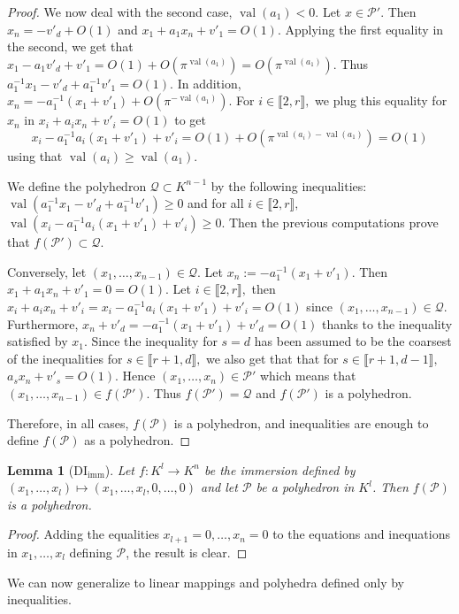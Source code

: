 \documentclass{elsarticle}
\theoremstyle{plain}
\newtheorem{lemma}[theorem]{Lemma}
\theoremstyle{definition}
\newcommand{\PP}{\mathcal{P}}
\newcommand{\Qc}{\mathcal{Q}}
\DeclareMathOperator{\val}{val}
\begin{document}
\begin{proof}
We now deal with the second case, $\val(a_1)<0.$
Let $x \in \PP'$.
Then $x_n=-v'_d+O(1)$
and $x_1+a_1 x_n+v'_1=O(1).$
Applying the first equality in the second, we get that
$x_1-a_1 v'_d +v'_1=O(1)+O(\pi^{\val(a_1)})=O(\pi^{\val(a_1)}).$
Thus $a_1^{-1}x_1- v'_d +a_1^{-1}v'_1=O(1)$.
In addition, $x_n=-a_1^{-1}(x_1+v'_1)+O(\pi^{-\val(a_1)}).$
For $i \in \llbracket 2,r \rrbracket,$ we plug this equality for $x_n$ in 
$x_i+a_i x_n+v'_i=O(1)$ to get
$$
x_i-a_1^{-1}a_i(x_1+v'_1)+v'_i=O(1)+O(\pi^{\val(a_i)-\val(a_1)})=O(1)
$$
using that $\val(a_i) \geq \val (a_1).$

We define the polyhedron $\Qc \subset K^{n-1}$ by the following inequalities:
$\val(a_1^{-1}x_1- v'_d +a_1^{-1}v'_1) \geq 0$ and for all $i \in \llbracket 2,r \rrbracket,$
$\val(x_i-a_1^{-1}a_i(x_1+v'_1)+v'_i) \geq 0.$
Then the previous computations prove that $f(\PP')\subset \Qc.$

Conversely, let $(x_1,\dots,x_{n-1}) \in \Qc.$
Let $x_n := -a_1^{-1}(x_1+v'_1).$
Then
$x_1+a_1 x_n+v'_1=0=O(1).$
Let $i \in \llbracket 2,r \rrbracket,$
then $x_i+a_i x_n+v'_i=x_i-a_1^{-1}a_i(x_1+v'_1)+v'_i=O(1)$
since $(x_1,\dots,x_{n-1}) \in \Qc.$
Furthermore, 
$x_n+v'_d=-a_1^{-1}(x_1+v'_1)+v'_d=O(1)$ thanks to the inequality satisfied by $x_1.$
Since the inequality for $s=d$ has been assumed to be 
the coarsest of the inequalities for $s \in \llbracket r+1,d \rrbracket,$
we also get that that for $s \in \llbracket r+1,d-1 \rrbracket,$
$a_s x_n+v'_s = O(1)$.
Hence $(x_1,\dots,x_n) \in \PP'$
which means that $(x_1,\dots,x_{n-1}) \in f(\PP').$
Thus $f(\PP')= \Qc$ and $f(\PP')$ is a polyhedron.

Therefore, in all cases, $f(\PP)$ is a polyhedron, and inequalities are enough to define
$f(\PP)$ as a polyhedron.
\end{proof}

\begin{lemma}[DI${}_{\mathrm{imm}}$]
  Let $f : K^l \to K^n$ be the immersion defined by
  $(x_1,\dots, x_l) \mapsto (x_1,\dots, x_l,0,\dots, 0)$ and let $\PP$ be
  a polyhedron in $K^l$. Then $f(\PP)$ is a polyhedron. \label{lem:DIimm}
\end{lemma}
\begin{proof}
Adding the equalities $x_{l+1}=0, \dots, x_n=0$ to the equations and inequations in
$x_1,\dots, x_l$ defining $\PP$, the result is clear.
\end{proof}

We can now generalize to linear mappings and polyhedra defined only by inequalities.
\end{document}
